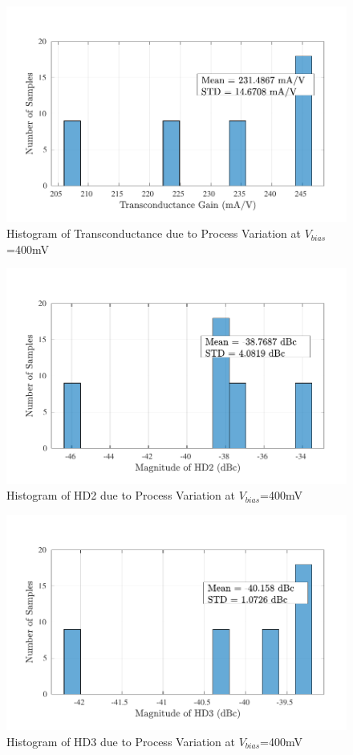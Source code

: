 \begin{figure} [H]
\centering
\includegraphics[scale=1]{Figures/Corners/Overall/Proc_Mid/PDFs/Proc_Mid_gm.pdf}
\caption{Histogram of Transconductance due to Process Variation at $V_{bias}$=400mV}
\end{figure}

\begin{figure} [H]
\centering
\includegraphics[scale=1]{Figures/Corners/Overall/Proc_Mid/PDFs/Proc_Mid_hd2.pdf}
\caption{Histogram of HD2 due to Process Variation at $V_{bias}$=400mV}
\end{figure}

\begin{figure} [H]
\centering
\includegraphics[scale=1]{Figures/Corners/Overall/Proc_Mid/PDFs/Proc_Mid_hd3.pdf}
\caption{Histogram of HD3 due to Process Variation at $V_{bias}$=400mV}
\end{figure}

